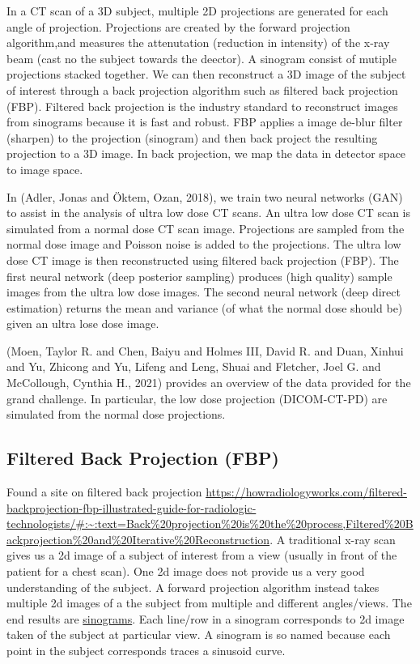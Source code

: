 \documentclass[a4paper, 11pt]{article}
\begin{document}
In a CT scan of a 3D subject, multiple 2D projections are generated for each angle of projection. Projections are created by the forward projection algorithm,and measures the attenutation (reduction in intensity) of the x-ray beam (cast no the subject towards the deector). A sinogram consist of mutiple projections stacked together. We can then reconstruct a 3D image of the subject of interest through a back projection algorithm such as filtered back projection (FBP). Filtered back projection is the industry standard to reconstruct images from sinograms because it is fast and robust. FBP applies a image de-blur filter (sharpen) to the projection (sinogram) and then back project the resulting projection to a 3D image. In back projection, we map the data in detector space to image space.

In (Adler, Jonas and Öktem, Ozan, 2018), we train two neural networks (GAN) to assist in the analysis of ultra low dose CT scans. An ultra low dose CT scan is simulated from a normal dose CT scan image. Projections are sampled from the normal dose image and Poisson noise is added to the projections. The ultra low dose CT image is then reconstructed using filtered back projection (FBP). The first neural network (deep posterior sampling) produces (high quality) sample images from the ultra low dose images. The second neural network (deep direct estimation) returns the mean and variance (of what the normal dose should be) given an ultra lose dose image.

(Moen, Taylor R. and Chen, Baiyu and Holmes III, David R. and Duan, Xinhui and Yu, Zhicong and Yu, Lifeng and Leng, Shuai and Fletcher, Joel G. and McCollough, Cynthia H., 2021) provides an overview of the data provided for the grand challenge. In particular, the low dose projection (DICOM-CT-PD) are simulated from the normal dose projections.

\subsection{Filtered Back Projection (FBP)}
\label{sec:org61c209e}
Found a site on filtered back projection \url{https://howradiologyworks.com/filtered-backprojection-fbp-illustrated-guide-for-radiologic-technologists/\#:\~:text=Back\%20projection\%20is\%20the\%20process,Filtered\%20Backprojection\%20and\%20Iterative\%20Reconstruction}. A traditional x-ray scan gives us a 2d image of a subject of interest from a view (usually in front of the patient for a chest scan). One 2d image does not provide us a very good understanding of the subject. A forward projection algorithm instead takes multiple 2d images of a the subject from multiple and different angles/views. The end results are \uline{sinograms}. Each line/row in a sinogram corresponds to 2d image taken of the subject at particular view. A sinogram is so named because each point in the subject corresponds traces a sinusoid curve.
\end{document}
